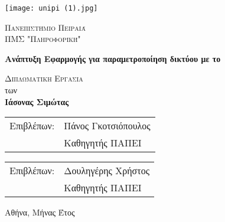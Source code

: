 \begin{titlepage}
    \begin{center}
        \vspace*{-1cm}
        
        \texttt{[image: unipi (1).jpg]}
        
        \Large
        \textsc{Πανεπιστήμιο Πειραιά}\\
        \large
        \textsc{ΠΜΣ "Πληροφορική"}\\
        
        \vspace{2.5cm}
        
        \Huge
        \textbf{Ανάπτυξη Εφαρμογής για παραμετροποίηση δικτύου με το }
        
        \vspace{3cm}
        \Large
        \textsc{Διπλωματικη Εργασια}\\
        των\\

        \LARGE
        \textbf{Ιάσονας Σιμώτας}
        
    \end{center}
    
    \vspace{3cm}
    
    \begin{tabular}{ll}
		Επιβλέπων: & Πάνος Γκοτσιόπουλος \\
		 & Καθηγητής ΠΑΠΕΙ
	\end{tabular}

    \begin{tabular}{ll}
		Επιβλέπων: & Δουληγέρης Χρήστος \\
		 & Καθηγητής ΠΑΠΕΙ
	\end{tabular}
	
    \vfill
    
    \begin{center}
    	 Αθήνα, Μήνας Έτος	
    \end{center}
\end{titlepage}